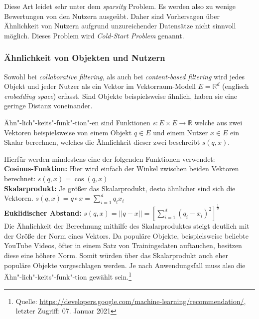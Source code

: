 \noindent
Diese Art leidet sehr unter dem \textit{sparsity} Problem. 
Es werden also zu wenige Bewertungen von den Nutzern ausgeübt. Daher sind Vorhersagen über Ähnlichkeit von Nutzern aufgrund unzureichender Datensätze nicht sinnvoll möglich. Dieses Problem wird \textit{Cold-Start Problem} genannt.

\subsubsection{Ähnlichkeit von Objekten und Nutzern}
Sowohl bei \textit{collaborative filtering}, als auch bei \textit{content-based filtering} wird jedes Objekt und jeder Nutzer als ein Vektor im Vektorraum-Modell $E = \mathbb{R}^d$ (englisch \textit{embedding space}) erfasst. Sind Objekte beispielsweise ähnlich, haben sie eine geringe Distanz voneinander. 

\noindent
Ähn"-lich"-keits"-funk"-tion"-en sind Funktionen $s : E \times E  \rightarrow \mathbb{R}$ welche aus zwei Vektoren beispielsweise von einem Objekt $q \in E$ und einem Nutzer $x \in E$ ein Skalar berechnen, welches die Ähnlichkeit dieser zwei beschreibt $s(q,x)$.

\noindent
Hierfür werden mindestens eine der folgenden Funktionen verwendet:\\

\noindent
{}
\textbf{Cosinus-Funktion:}
Hier wird einfach der Winkel zwischen beiden Vektoren berechnet: $s(q,x) = \cos(q,x)$ \\

\noindent
{}
\textbf{Skalarprodukt:}
Je größer das Skalarprodukt, desto ähnlicher sind sich die Vektoren. $s(q,x) = q \circ x = \sum_{i=1}^{d}q_i x_i$ \\

\noindent
{}
\textbf{Euklidischer Abstand:}
$s(q,x) = ||q-x|| = [\sum_{i=1}^{d}(q_i - x_i)^2]^\frac{1}{2}$\\

\noindent
Die Ähnlichkeit der Berechnung mithilfe des Skalarproduktes steigt deutlich mit der Größe der Norm eines Vektors.
Da populäre Objekte, beispielsweise beliebte YouTube Videos, öfter in einem Satz von Trainingsdaten auftauchen, besitzen diese eine höhere Norm.
Somit würden über das Skalarprodukt auch eher populäre Objekte vorgeschlagen werden.
Je nach Anwendungsfall muss also die Ähn"-lich"-keits"-funk"-tion gewählt sein.\footnote{Quelle: \url{https://developers.google.com/machine-learning/recommendation/}, letzter Zugriff: 07. Januar 2021}